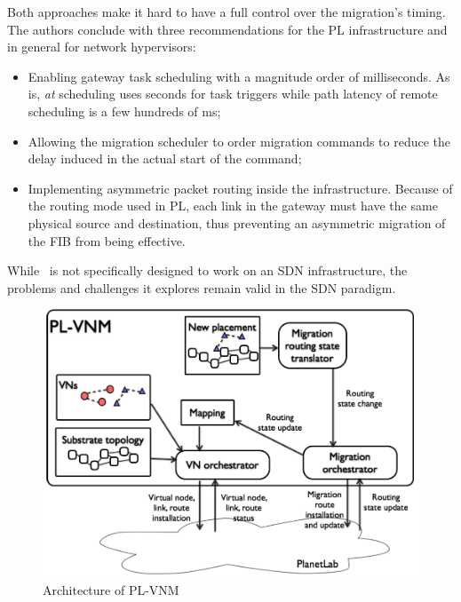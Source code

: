 Both approaches make it hard to have a full control over the migration's timing.
The authors conclude with three recommendations for the PL infrastructure and in general for network hypervisors:
\begin{itemize}
\item Enabling gateway task scheduling with a magnitude order of milliseconds. As is, \textit{at} scheduling uses seconds for task triggers while path latency of remote scheduling is a few hundreds of ms;
\item Allowing the migration scheduler to order migration commands to reduce the delay induced in the actual start of the command;
\item Implementing asymmetric packet routing inside the infrastructure.
Because of the routing mode used in PL, each link in the gateway must have the same physical source and destination, thus preventing an asymmetric migration of the FIB from being effective. 
\end{itemize}
While~\cite{Lo2014} is not specifically designed to work on an SDN infrastructure, the problems and challenges it explores remain valid in the SDN paradigm.

\begin{figure}[ht]
    \centering
    \includegraphics[scale=0.5]{figures/pl-vnm.png}
    \caption{Architecture of PL-VNM~\cite{Lo2014}}
    \label{fig:plvnm}
\end{figure}


